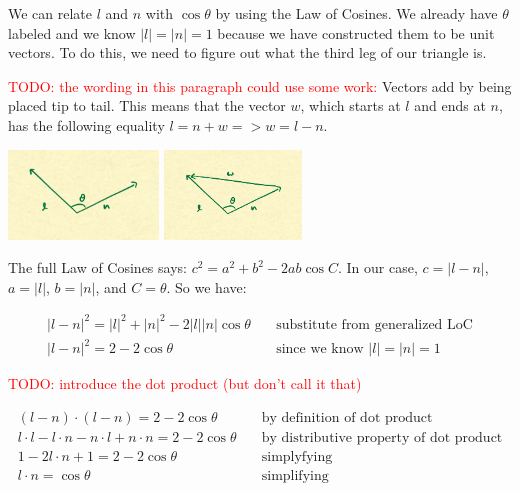 \documentclass{article}
\newcommand\todo[1]{\textcolor{red}{TODO: #1}}
\begin{document}
We can relate $l$ and $n$ with $\cos \theta$ by using the Law of Cosines.
We already have $\theta$ labeled and we know $|l| = |n| = 1$ because we have constructed them to be unit vectors.
To do this, we need to figure out what the third leg of our triangle is.

\todo{the wording in this paragraph could use some work:}
Vectors add by being placed tip to tail.
This means that the vector $w$, which starts at $l$ and ends at $n$, has the following equality $l = n + w => w = l - n$.

\begin{center}
	\includegraphics[width=0.3\textwidth,frame]{assets/ln.jpg}
	\hspace{0.2\textwidth}
	\includegraphics[width=0.2735\textwidth,frame]{assets/lnw.jpg}
\end{center}

The full Law of Cosines says: $c^2 = a^2 + b^2 - 2ab \cos C$.
In our case, $c = | l - n |$, $a = |l|$, $b = |n|$, and $C = \theta$.
So we have:

\begin{align*}
|l-n|^2 = |l|^2 + |n|^2 - 2 |l| |n| \cos \theta & \quad \text{substitute from generalized LoC} \\
|l-n|^2 = 2 - 2 \cos \theta & \quad \text{since we know } |l| = |n| = 1
\end{align*}

\todo{introduce the dot product (but don't call it that)}

\begin{align*}
(l - n) \cdot (l - n) = 2 - 2 \cos \theta & \quad \text{by definition of dot product} \\
l \cdot l - l \cdot n - n \cdot l + n \cdot n = 2 - 2 \cos \theta & \quad \text{by distributive property of dot product} \\
1 - 2 l \cdot n + 1 = 2 - 2 \cos \theta & \quad \text{simplyfying} \\
l \cdot n = \cos \theta & \quad \text{simplifying}
\end{align*}
\end{document}
